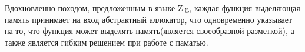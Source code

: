 
Вдохновленно походом, предложенным в языке Zig, каждая функция выделяющая память принимает на вход абстрактный аллокатор,
что одновременно указывает на то, что функция может выделять память(является своеобразной разметкой), 
а также является гибким решением при работе с паматью.












